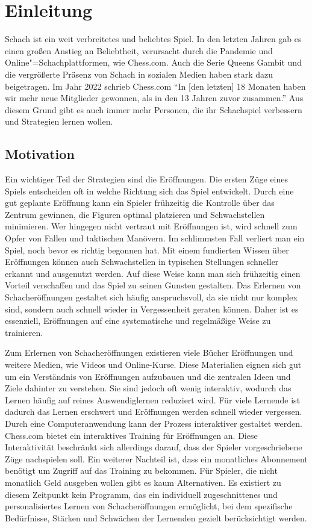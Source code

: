 
\chapter{Einleitung}

Schach ist ein weit verbreitetes und beliebtes Spiel. In den letzten Jahren gab es einen großen Anstieg an Beliebtheit, verursacht durch die Pandemie und Online"=Schachplattformen, wie Chess.com. Auch die Serie Queens Gambit und die vergrößerte Präsenz von Schach in sozialen Medien haben stark dazu beigetragen. Im Jahr 2022 schrieb Chess.com\: \enquote{In [den letzten] 18 Monaten haben wir mehr neue Mitglieder gewonnen, als in den 13 Jahren zuvor zusammen.} \cite{chesscom_chesscom_2022}
Aus diesem Grund gibt es auch immer mehr Personen, die ihr Schachspiel verbessern und Strategien lernen wollen.

\section{Motivation}
Ein wichtiger Teil der Strategien sind die Eröffnungen. Die ersten Züge eines Spiels entscheiden oft in welche Richtung sich das Spiel entwickelt. Durch eine gut geplante Eröffnung kann ein Spieler frühzeitig die Kontrolle über das Zentrum gewinnen, die Figuren optimal platzieren und Schwachstellen minimieren. Wer hingegen nicht vertraut mit Eröffnungen ist, wird schnell zum Opfer von Fallen und taktischen Manövern. Im schlimmsten Fall verliert man ein Spiel, noch bevor es richtig begonnen hat. Mit einem fundierten Wissen über Eröffnungen können auch Schwachstellen in typischen Stellungen schneller erkannt und ausgenutzt werden. Auf diese Weise kann man sich frühzeitig einen Vorteil verschaffen und das Spiel zu seinen Gunsten gestalten. Das Erlernen von Schacheröffnungen gestaltet sich häufig anspruchsvoll, da sie nicht nur komplex sind, sondern auch schnell wieder in Vergessenheit geraten können. Daher ist es essenziell, Eröffnungen auf eine systematische und regelmäßige Weise zu trainieren.

Zum Erlernen von Schacheröffnungen existieren viele Bücher Eröffnungen und weitere Medien, wie Videos und Online-Kurse. Diese Materialien eignen sich gut um ein Verständnis von Eröffnungen aufzubauen und die zentralen Ideen und Ziele dahinter zu verstehen.
Sie sind jedoch oft wenig interaktiv, wodurch das Lernen häufig auf reines Auswendiglernen reduziert wird. Für viele Lernende ist dadurch das Lernen erschwert  und Eröffnungen werden schnell wieder vergessen. Durch eine Computeranwendung kann der Prozess interaktiver gestaltet werden. Chess.com bietet ein interaktives Training für Eröffnungen an. Diese Interaktivität beschränkt sich allerdings darauf, dass der Spieler vorgeschriebene Züge nachspielen soll. Ein weiterer Nachteil ist, dass ein monatliches Abonnement benötigt um Zugriff auf das Training zu bekommen. Für Spieler, die nicht monatlich Geld ausgeben wollen gibt es kaum Alternativen.
Es existiert zu diesem Zeitpunkt kein Programm, das ein individuell zugeschnittenes und personalisiertes Lernen von Schacheröffnungen ermöglicht, bei dem spezifische Bedürfnisse, Stärken und Schwächen der Lernenden gezielt berücksichtigt werden.

